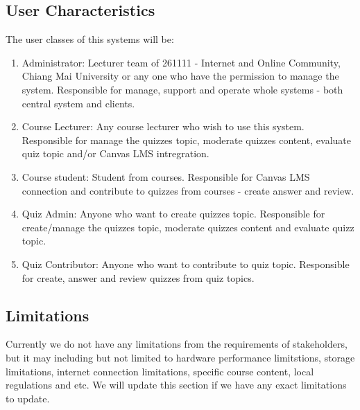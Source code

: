 \documentclass[ 10pt]{report}
\begin{document}
            \subsection{User Characteristics}
            The user classes of this systems will be:
            \begin{enumerate}
                \item Administrator: Lecturer team of 261111 - Internet and Online Community, Chiang Mai University or any one who have the permission to manage the system. Responsible for manage, support and operate whole systems - both central system and clients.
                \item Course Lecturer: Any course lecturer who wish to use this system. Responsible for manage the quizzes topic, moderate quizzes content, evaluate quiz topic and/or Canvas LMS intregration.
                \item Course student: Student from courses. Responsible for Canvas LMS connection and contribute to quizzes from courses - create answer and review.  
                \item Quiz Admin: Anyone who want to create quizzes topic. Responsible for create/manage the quizzes topic, moderate quizzes content and evaluate quizz topic.
                \item Quiz Contributor: Anyone who want to contribute to quiz topic. Responsible for create, answer and review quizzes from quiz topics.
            \end{enumerate}
            \subsection{Limitations}
            Currently we do not have any limitations from the requirements of stakeholders, but it may including but not limited to hardware performance limitstions, storage limitations, internet connection limitations, specific course content, local regulations and etc. We will update this section if we have any exact limitations to update.
\end{document}
